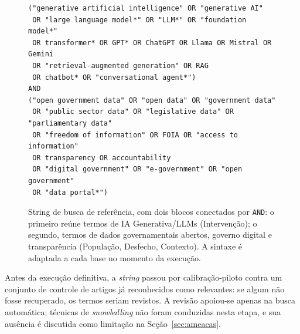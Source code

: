 \begin{figure}[tp]
\centering
\begin{minipage}{0.95\textwidth}
\begin{small}
\begin{verbatim}
("generative artificial intelligence" OR "generative AI"
 OR "large language model*" OR "LLM*" OR "foundation model*"
 OR transformer* OR GPT* OR ChatGPT OR Llama OR Mistral OR Gemini
 OR "retrieval-augmented generation" OR RAG
 OR chatbot* OR "conversational agent*")
AND
("open government data" OR "open data" OR "government data"
 OR "public sector data" OR "legislative data" OR "parliamentary data"
 OR "freedom of information" OR FOIA OR "access to information"
 OR transparency OR accountability
 OR "digital government" OR "e-government" OR "open government"
 OR "data portal*")
\end{verbatim}
\end{small}
\end{minipage}
\caption{String de busca de referência, com dois blocos conectados por \texttt{AND}: o primeiro reúne termos de IA Generativa/LLMs (Intervenção); o segundo, termos de dados governamentais abertos, governo digital e transparência (População, Desfecho, Contexto). A sintaxe é adaptada a cada base no momento da execução.}
\label{fig:string}
\end{figure}


Antes da execução definitiva, a \textit{string} passou por calibração-piloto contra um conjunto de controle de artigos já reconhecidos como relevantes: se algum não fosse recuperado, os termos seriam revistos. A revisão apoiou-se apenas na busca automática; técnicas de \textit{snowballing} \citep{wohlin2014} não foram conduzidas nesta etapa, e sua ausência é discutida como limitação na Seção~\ref{sec:ameacas}.


